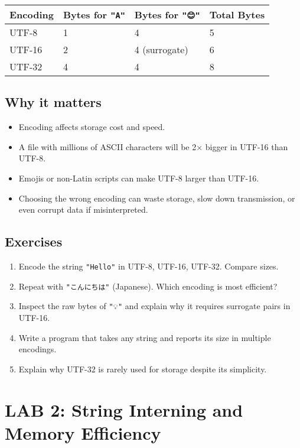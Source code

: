 \documentclass[
  letterpaper,
  DIV=11,
  numbers=noendperiod]{scrreprt}
\providecommand{\tightlist}{%
  \setlength{\itemsep}{0pt}\setlength{\parskip}{0pt}}
\begin{document}
\begin{longtable}[]{@{}llll@{}}
\toprule\noalign{}
Encoding & Bytes for \texttt{"A"} & Bytes for \texttt{"😊"} & Total
Bytes \\
\midrule\noalign{}
\endhead
\bottomrule\noalign{}
\endlastfoot
UTF-8 & 1 & 4 & 5 \\
UTF-16 & 2 & 4 (surrogate) & 6 \\
UTF-32 & 4 & 4 & 8 \\
\end{longtable}

\subsection{Why it matters}\label{why-it-matters-45}

\begin{itemize}
\tightlist
\item
  Encoding affects storage cost and speed.
\item
  A file with millions of ASCII characters will be 2× bigger in UTF-16
  than UTF-8.
\item
  Emojis or non-Latin scripts can make UTF-8 larger than UTF-16.
\item
  Choosing the wrong encoding can waste storage, slow down transmission,
  or even corrupt data if misinterpreted.
\end{itemize}

\subsection{Exercises}\label{exercises-44}

\begin{enumerate}
\def\labelenumi{\arabic{enumi}.}
\tightlist
\item
  Encode the string \texttt{"Hello"} in UTF-8, UTF-16, UTF-32. Compare
  sizes.
\item
  Repeat with \texttt{"こんにちは"} (Japanese). Which encoding is most
  efficient?
\item
  Inspect the raw bytes of \texttt{"💡"} and explain why it requires
  surrogate pairs in UTF-16.
\item
  Write a program that takes any string and reports its size in multiple
  encodings.
\item
  Explain why UTF-32 is rarely used for storage despite its simplicity.
\end{enumerate}

\section{LAB 2: String Interning and Memory
Efficiency}\label{lab-2-string-interning-and-memory-efficiency}
\end{document}
